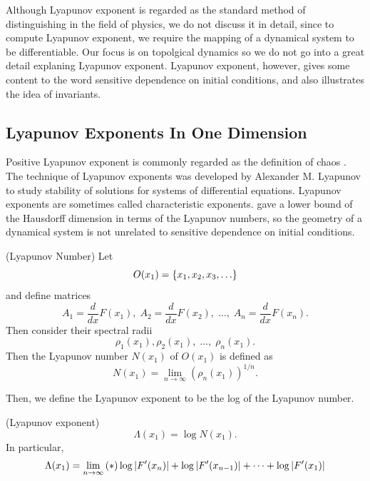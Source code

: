 \documentclass[12pt,twoside,draft]{book}
\begin{document}
Although Lyapunov exponent is regarded as the standard method of distinguishing in the field of physics, we do not discuss it in detail, since to compute Lyapunov exponent, we require the mapping of a dynamical system to be differentiable.
Our focus is on topolgical dynamics so we do not go into a great detail explaning Lyapunov exponent.
Lyapunov exponent, however, gives some content to the word sensitive dependence on initial conditions, and also illustrates the idea of invariants.
\subsection*{Lyapunov Exponents In One Dimension}
Positive Lyapunov exponent is commonly regarded as the definition of chaos \citep{kantz-schreiber}.
The technique of Lyapunov exponents was developed by Alexander M. Lyapunov to study stability of solutions for systems of differential equations.
Lyapunov exponents are sometimes called characteristic exponents.
\citet{young} gave a lower bound of the Hausdorff dimension in terms of the Lyapunov numbers, so the geometry of a dynamical system is not unrelated to sensitive dependence on initial conditions.
\begin{definition}
  (Lyapunov Number)
  Let
  \begin{equation*}
    O(x_1) = \left \{ x_1, x_2, x_3, \ldots \right \}
  \end{equation*}
  and define matrices
  \begin{equation*}
    A_1 = \frac{d}{dx}F(x_1),\; A_2 = \frac{d}{dx}F(x_2),\; \ldots,\; A_n = \frac{d}{dx}F(x_n).
  \end{equation*}
  Then consider their spectral radii
  \begin{equation*}
    \rho_1(x_1), \rho_2(x_1),\; \ldots,\; \rho_n(x_1).
  \end{equation*}
  Then the Lyapunov number $N(x_1)$ of $O(x_1)$ is defined as 
  \begin{equation*}
    N(x_1) = \lim\limits_{n \to \infty} (\rho_n(x_1))^{1/n}.
  \end{equation*}
\end{definition}
Then, we define the Lyapunov exponent to be the log of the Lyapunov number.
\begin{definition}
  (Lyapunov exponent)
  \begin{equation*}
    \Lambda(x_1) = \log N(x_1).
  \end{equation*}
  In particular,
  \begin{equation*}
    \Lambda(x_1) = \lim\limits_{n \to \infty} \left ( * \right ){\log\left | F'(x_n) \right | + \log\left | F'(x_{n-1}) \right | + \cdots + \log\left | F'(x_1) \right |}
  \end{equation*}
\end{definition}
\end{document}
